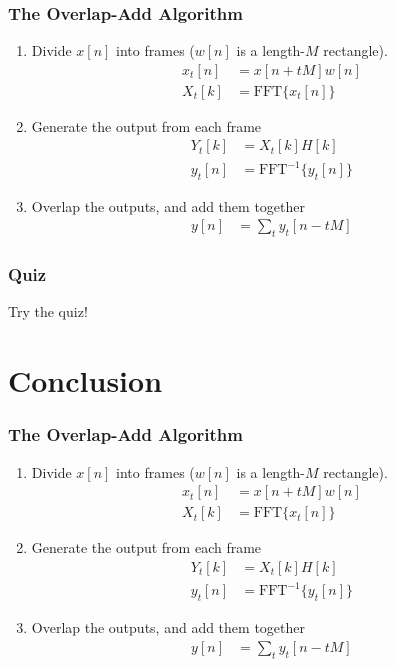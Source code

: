 \documentclass{beamer}
\begin{document}
\begin{frame}
  \frametitle{The Overlap-Add Algorithm}

  \begin{enumerate}
    \item Divide $x[n]$ into frames ($w[n]$ is a length-$M$ rectangle).
      \begin{align*}
        x_t[n] &= x[n+tM]w[n]\\
        X_t[k] &= \text{FFT}\{x_t[n]\}
      \end{align*}
    \item Generate the output from each frame
      \begin{align*}
        Y_t[k] &= X_t[k]H[k]\\
        y_t[n] &= \text{FFT}^{-1}\{y_t[n]\}
      \end{align*}
    \item  Overlap the outputs, and add them together
      \begin{align*}
        y[n] &= \sum_t y_t[n-tM]
      \end{align*}
  \end{enumerate}
\end{frame}

\begin{frame}
  \frametitle{Quiz}
  Try the quiz!
\end{frame}

\section[Conclusion]{Conclusion}
\setcounter{subsection}{1}

\begin{frame}
  \frametitle{The Overlap-Add Algorithm}

  \begin{enumerate}
    \item Divide $x[n]$ into frames ($w[n]$ is a length-$M$ rectangle).
      \begin{align*}
        x_t[n] &= x[n+tM]w[n]\\
        X_t[k] &= \text{FFT}\{x_t[n]\}
      \end{align*}
    \item Generate the output from each frame
      \begin{align*}
        Y_t[k] &= X_t[k]H[k]\\
        y_t[n] &= \text{FFT}^{-1}\{y_t[n]\}
      \end{align*}
    \item  Overlap the outputs, and add them together
      \begin{align*}
        y[n] &= \sum_t y_t[n-tM]
      \end{align*}
  \end{enumerate}
\end{frame}
\end{document}
